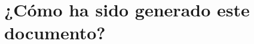 \documentclass{subfiles}
\begin{document}
  \chapter{¿Cómo ha sido generado este documento?}
\end{document}

